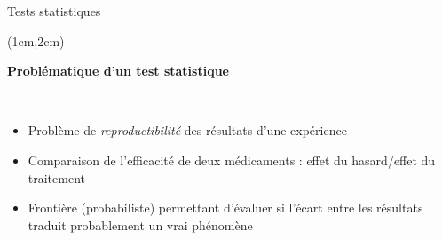 \documentclass{beamer}
\begin{document}

\begin{frame}{Tests statistiques}
\begin{textblock*}{\textwidth}(1cm,2cm)


\begin{center}{\bf \Large Problématique d'un test statistique} \end{center}
\
\

\begin{itemize}
\item Problème de {\it reproductibilité} des résultats d'une expérience
\vspace{0.2cm}
\item Comparaison de l'efficacité de deux médicaments : effet du hasard/effet du traitement
\vspace{0.2cm}
\item Frontière (probabiliste) permettant d'évaluer si l'écart 
entre les résultats traduit probablement un \og vrai\fg{} phénomène 

\end{itemize}


 \end{textblock*}

\end{frame}



\end{document}
